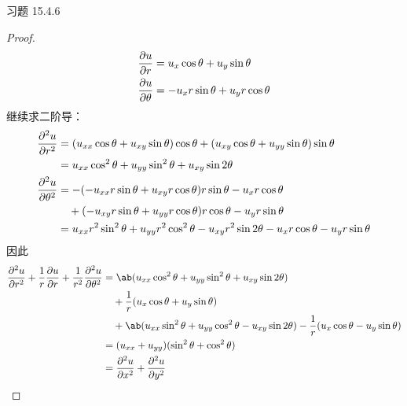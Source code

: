 \begin{problem}
    习题 15.4.6
    \begin{proof}
        $$
        \begin{aligned}
            \pdv{u}{r} & = u_x \cos \theta + u_y \sin \theta \\
            \pdv{u}{\theta} & = -u_x r \sin \theta + u_y r \cos \theta \\
        \end{aligned}
        $$
        继续求二阶导：
        $$
        \begin{aligned}
            \pdv[2]{u}{r} & = (u_{xx} \cos \theta + u_{xy} \sin \theta) \cos \theta + (u_{xy} \cos \theta + u_{yy} \sin \theta) \sin \theta \\
            & = u_{xx} \cos^2 \theta + u_{yy} \sin^2 \theta + u_{xy} \sin 2\theta \\
            \pdv[2]{u}{\theta} & = -(-u_{xx} r \sin \theta + u_{xy} r \cos \theta) r \sin \theta - u_x r \cos \theta \\
            & \quad + (-u_{xy} r \sin \theta + u_{yy} r \cos \theta) r \cos \theta - u_y r \sin \theta \\
            & = u_{xx} r^2 \sin^2 \theta + u_{yy} r^2 \cos^2 \theta - u_{xy} r^2 \sin 2\theta - u_x r \cos \theta - u_y r \sin \theta
        \end{aligned}
        $$
        因此
        $$
        \begin{aligned}
            \pdv[2]{u}{r} + \frac{1}{r} \pdv{u}{r} + \frac{1}{r^2} \pdv[2]{u}{\theta} & = \ab(u_{xx} \cos^2 \theta + u_{yy} \sin^2 \theta + u_{xy} \sin 2\theta) \\
            & \quad + \frac{1}{r} (u_x \cos \theta + u_y \sin \theta) \\
            & \quad + \ab(u_{xx} \sin^2 \theta + u_{yy} \cos^2 \theta - u_{xy} \sin 2\theta) - \frac{1}{r} (u_x \cos \theta - u_y \sin \theta) \\
            & = (u_{xx} + u_{yy}) (\sin^2 \theta + \cos^2 \theta) \\
            & = \pdv[2]{u}{x} + \pdv[2]{u}{y}
        \end{aligned}
        $$
    \end{proof}
\end{problem}